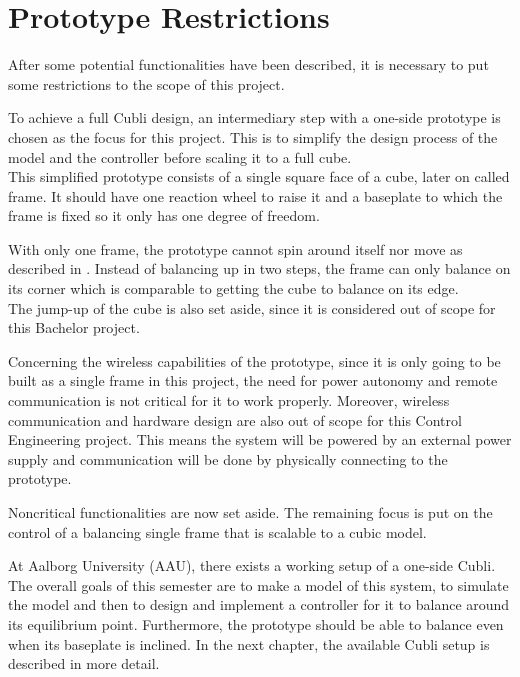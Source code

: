 \section{Prototype Restrictions}\label{sec:protoRestrictions}
After some potential functionalities have been described, it is necessary to put some restrictions to the scope of this project.

To achieve a full Cubli design, an intermediary step with a one-side prototype is chosen as the focus for this project. This is to simplify the design process of the model and the controller before scaling it to a full cube.\\
This simplified prototype consists of a single square face of a cube, later on called frame. It should have one reaction wheel to raise it and a baseplate to which the frame is fixed so it only has one degree of freedom.

With only one frame, the prototype cannot spin around itself nor move as described in . Instead of balancing up in two steps, the frame can only balance on its corner which is comparable to getting the cube to balance on its edge.\\
The jump-up of the cube is also set aside, since it is considered out of scope for this Bachelor project.

Concerning the wireless capabilities of the prototype, since it is only going to be built as a single frame in this project, the need for power autonomy and remote communication is not critical for it to work properly. Moreover, wireless communication and hardware design are also out of scope for this Control Engineering project. This means the system will be powered by an external power supply and communication will be done by physically connecting to the prototype.

Noncritical functionalities are now set aside. The remaining focus is put on the control of a balancing single frame that is scalable to a cubic model.

At Aalborg University (AAU), there exists a working setup of a one-side Cubli. The overall goals of this semester are to make a model of this system, to simulate the model and then to design and implement a controller for it to balance around its equilibrium point. Furthermore, the prototype should be able to balance even when its baseplate is inclined.
In the next chapter, the available Cubli setup is described in more detail.



